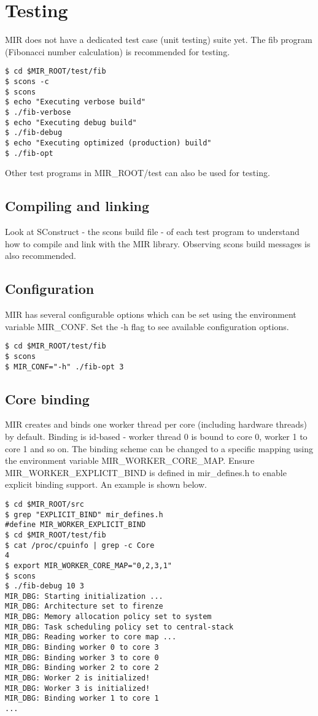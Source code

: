 \documentclass[11pt,a4paper,notitlepage]{article}
\begin{document}
\section{Testing}
MIR does not have a dedicated test case (unit testing) suite yet. The fib program (Fibonacci number calculation) is recommended for testing.

\begin{lstlisting}[style=BashInputStyle]
$ cd $MIR_ROOT/test/fib
$ scons -c
$ scons
$ echo "Executing verbose build"
$ ./fib-verbose
$ echo "Executing debug build"
$ ./fib-debug
$ echo "Executing optimized (production) build"
$ ./fib-opt
\end{lstlisting}

Other test programs in MIR\_ROOT/test can also be used for testing.

\subsection{Compiling and linking}
Look at SConstruct - the scons build file - of each test program to understand how to compile and link with the MIR library. Observing scons build messages is also recommended.

\subsection{Configuration}
MIR has several configurable options which can be set using the environment variable MIR\_CONF. Set the -h flag to see available configuration options.

\begin{lstlisting}[style=BashInputStyle]
$ cd $MIR_ROOT/test/fib
$ scons 
$ MIR_CONF="-h" ./fib-opt 3
\end{lstlisting}

\subsection{Core binding}
MIR creates and binds one worker thread per core (including hardware threads) by default. Binding is id-based - worker thread 0 is bound to core 0, worker 1 to core 1 and so on. The binding scheme can be changed to a specific mapping using the environment variable MIR\_WORKER\_CORE\_MAP. Ensure MIR\_WORKER\_EXPLICIT\_BIND is defined in mir\_defines.h to enable explicit binding support. An example is shown below.

\begin{lstlisting}[style=BashInputStyle]
$ cd $MIR_ROOT/src
$ grep "EXPLICIT_BIND" mir_defines.h
#define MIR_WORKER_EXPLICIT_BIND
$ cd $MIR_ROOT/test/fib
$ cat /proc/cpuinfo | grep -c Core
4
$ export MIR_WORKER_CORE_MAP="0,2,3,1"
$ scons 
$ ./fib-debug 10 3
MIR_DBG: Starting initialization ...
MIR_DBG: Architecture set to firenze
MIR_DBG: Memory allocation policy set to system
MIR_DBG: Task scheduling policy set to central-stack
MIR_DBG: Reading worker to core map ...
MIR_DBG: Binding worker 0 to core 3
MIR_DBG: Binding worker 3 to core 0
MIR_DBG: Binding worker 2 to core 2
MIR_DBG: Worker 2 is initialized!
MIR_DBG: Worker 3 is initialized!
MIR_DBG: Binding worker 1 to core 1
...
\end{lstlisting}
\end{document}
